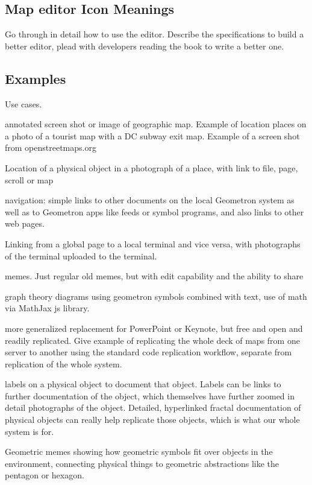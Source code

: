 \subsection{Map editor Icon Meanings}\label{map-editor-icon-meanings}

Go through in detail how to use the editor. Describe the specifications to build a better editor, plead with developers reading the book to write a better one.  

\subsection{Examples}

Use cases. 

annotated screen shot or image of geographic map.  Example of location places on a photo of a tourist map with a DC subway exit map. Example of a screen shot from openstreetmaps.org

Location of a physical object in a photograph of a place, with link to file, page, scroll or map
 
navigation: simple links to other documents on the local Geometron system as well as to Geometron apps like feeds or symbol programs, and also links to other web pages.

Linking from a global page to a local terminal and vice versa, with photographs of the terminal uploaded to the terminal.

memes. Just regular old memes, but with edit capability and the ability to share

graph theory diagrams using geometron symbols combined with text, use of math via MathJax js library.

more generalized replacement for PowerPoint or Keynote, but free and open and readily replicated.  Give example of replicating the whole deck of maps from one server to another using the standard code replication workflow, separate from replication of the whole system.  

labels on a physical object to document that object.  Labels can be links to further documentation of the object, which themselves have further zoomed in detail photographs of the object.  Detailed, hyperlinked fractal documentation of physical objects can really help replicate those objects, which is what our whole system is for.

Geometric memes showing how geometric symbols fit over objects in the environment, connecting physical things to geometric abstractions like the pentagon or hexagon.

